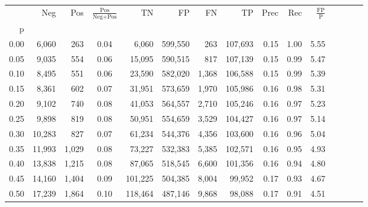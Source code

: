 \begin{tabular}{rrrcrrrrrrrrrrr}
\toprule
{} &     Neg &     Pos & $\frac{\text{Pos}}{\text{Neg}+\text{Pos}}$ &       TN &       FP &       FN &       TP &  Prec &   Rec & $\frac{\text{FP}}{\text{P}}$ \\
p    &         &         &                                            &          &          &          &          &       &       &                              \\
\midrule
0.00 &   6,060 &     263 &                                       0.04 &    6,060 &  599,550 &      263 &  107,693 &  0.15 &  1.00 &                         5.55 \\
0.05 &   9,035 &     554 &                                       0.06 &   15,095 &  590,515 &      817 &  107,139 &  0.15 &  0.99 &                         5.47 \\
0.10 &   8,495 &     551 &                                       0.06 &   23,590 &  582,020 &    1,368 &  106,588 &  0.15 &  0.99 &                         5.39 \\
0.15 &   8,361 &     602 &                                       0.07 &   31,951 &  573,659 &    1,970 &  105,986 &  0.16 &  0.98 &                         5.31 \\
0.20 &   9,102 &     740 &                                       0.08 &   41,053 &  564,557 &    2,710 &  105,246 &  0.16 &  0.97 &                         5.23 \\
0.25 &   9,898 &     819 &                                       0.08 &   50,951 &  554,659 &    3,529 &  104,427 &  0.16 &  0.97 &                         5.14 \\
0.30 &  10,283 &     827 &                                       0.07 &   61,234 &  544,376 &    4,356 &  103,600 &  0.16 &  0.96 &                         5.04 \\
0.35 &  11,993 &   1,029 &                                       0.08 &   73,227 &  532,383 &    5,385 &  102,571 &  0.16 &  0.95 &                         4.93 \\
0.40 &  13,838 &   1,215 &                                       0.08 &   87,065 &  518,545 &    6,600 &  101,356 &  0.16 &  0.94 &                         4.80 \\
0.45 &  14,160 &   1,404 &                                       0.09 &  101,225 &  504,385 &    8,004 &   99,952 &  0.17 &  0.93 &                         4.67 \\
0.50 &  17,239 &   1,864 &                                       0.10 &  118,464 &  487,146 &    9,868 &   98,088 &  0.17 &  0.91 &                         4.51 \\

\end{tabular}
